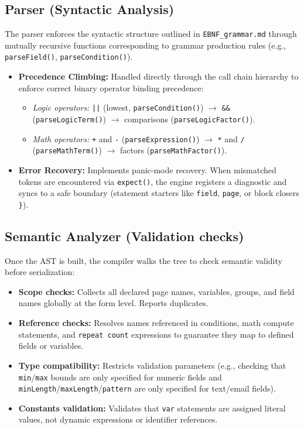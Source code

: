 \documentclass[10pt,a4paper]{article}
\begin{document}
\subsection{Parser (Syntactic Analysis)}
The parser enforces the syntactic structure outlined in \texttt{EBNF\_grammar.md} through mutually recursive functions corresponding to grammar production rules (e.g., \texttt{parseField()}, \texttt{parseCondition()}).
\begin{itemize}[leftmargin=*]
  \item \textbf{Precedence Climbing:} Handled directly through the call chain hierarchy to enforce correct binary operator binding precedence:
    \begin{itemize}
      \item \textit{Logic operators:} \texttt{||} (lowest, \texttt{parseCondition()}) $\rightarrow$ \texttt{\&\&} (\texttt{parseLogicTerm()}) $\rightarrow$ comparisons (\texttt{parseLogicFactor()}).
      \item \textit{Math operators:} \texttt{+} and \texttt{-} (\texttt{parseExpression()}) $\rightarrow$ \texttt{*} and \texttt{/} (\texttt{parseMathTerm()}) $\rightarrow$ factors (\texttt{parseMathFactor()}).
    \end{itemize}
  \item \textbf{Error Recovery:} Implements panic-mode recovery. When mismatched tokens are encountered via \texttt{expect()}, the engine registers a diagnostic and syncs to a safe boundary (statement starters like \texttt{field}, \texttt{page}, or block closers \texttt{\}}).
\end{itemize}

\subsection{Semantic Analyzer (Validation checks)}
Once the AST is built, the compiler walks the tree to check semantic validity before serialization:
\begin{itemize}[leftmargin=*]
  \item \textbf{Scope checks:} Collects all declared page names, variables, groups, and field names globally at the form level. Reports duplicates.
  \item \textbf{Reference checks:} Resolves names referenced in conditions, math compute statements, and \texttt{repeat count} expressions to guarantee they map to defined fields or variables.
  \item \textbf{Type compatibility:} Restricts validation parameters (e.g., checking that \texttt{min}/\texttt{max} bounds are only specified for numeric fields and \texttt{minLength}/\texttt{maxLength}/\texttt{pattern} are only specified for text/email fields).
  \item \textbf{Constants validation:} Validates that \texttt{var} statements are assigned literal values, not dynamic expressions or identifier references.
\end{itemize}
\end{document}
